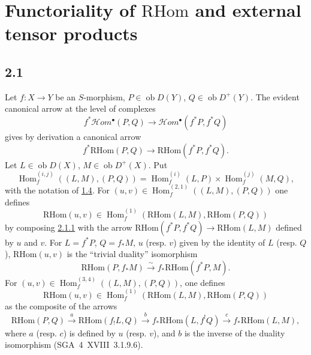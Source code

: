 \documentclass[11pt]{article}
\DeclareMathOperator{\Hom}{Hom}
\newcommand{\ob}{\operatorname{ob}}
\providecommand{\RHom}{\mathrm{RHom}}
\providecommand{\RHom}{\mathrm{RHom}}
\providecommand{\Hom}{\operatorname{Hom}}
\providecommand{\ob}{\operatorname{ob}}
\providecommand{\RHom}{\mathrm R\mathcal{H}om}
\providecommand{\RHom}{\mathrm{RHom}}
\providecommand{\Hom}{\operatorname{Hom}}
\begin{document}
\section{Functoriality of \texorpdfstring{$\RHom$}{RHom} and external tensor products}

\subsection*{2.1}\label{sga5:III:subsection:2.1}
Let $f:X\to Y$ be an $S$-morphism, $P\in\ob D(Y)$, $Q\in\ob D^{+}(Y)$. The evident canonical arrow at the level of complexes
\[
f^{*}\mathcal Hom^{\bullet}(P,Q)\longrightarrow\mathcal Hom^{\bullet}(f^{*}P,f^{*}Q)
\]
gives by derivation a canonical arrow
\begin{equation}\tag{2.1.1}\label{sga5:III:equation:2.1.1}
f^{*}\RHom(P,Q)\longrightarrow\RHom(f^{*}P,f^{*}Q).
\end{equation}
Let $L\in\ob D(X)$, $M\in\ob D^{+}(X)$. Put
\begin{equation}\tag{2.1.2}\label{sga5:III:equation:2.1.2}
\Hom_f^{(i,j)}((L,M),(P,Q))=\Hom_f^{(i)}(L,P)\times\Hom_f^{(j)}(M,Q),
\end{equation}
with the notation of \hyperref[sga5:III:subsection:1.4]{1.4}. For $(u,v)\in\Hom_f^{(2,1)}((L,M),(P,Q))$ one defines
\begin{equation}\tag{2.1.3}\label{sga5:III:equation:2.1.3}
\RHom(u,v)\in\Hom_f^{(1)}(\RHom(L,M),\RHom(P,Q))
\end{equation}
by composing \hyperref[sga5:III:equation:2.1.1]{2.1.1} with the arrow $\RHom(f^{*}P,f^{*}Q)\to\RHom(L,M)$ defined by $u$ and $v$. For $L=f^{*}P$, $Q=f_{*}M$, $u$ (resp. $v$) given by the identity of $L$ (resp. $Q$), $\RHom(u,v)$ is the ``trivial duality'' isomorphism
\begin{equation}\tag{2.1.4}\label{sga5:III:equation:2.1.4}
\RHom(P,f_{*}M)\xrightarrow{\sim}f_{*}\RHom(f^{*}P,M).
\end{equation}
For $(u,v)\in\Hom_f^{(3,4)}((L,M),(P,Q))$, one defines
\begin{equation}\tag{2.1.5}\label{sga5:III:equation:2.1.5}
\RHom(u,v)\in\Hom_f^{(1)}(\RHom(L,M),\RHom(P,Q))
\end{equation}
as the composite of the arrows
\[
\RHom(P,Q)\xrightarrow{a}\RHom(f_{!}L,Q)\xrightarrow{b}f_{*}\RHom(L,f^{!}Q)\xrightarrow{c}f_{*}\RHom(L,M),
\]
where $a$ (resp. $c$) is defined by $u$ (resp. $v$), and $b$ is the inverse of the duality isomorphism (SGA~4~XVIII~3.1.9.6).
\end{document}

